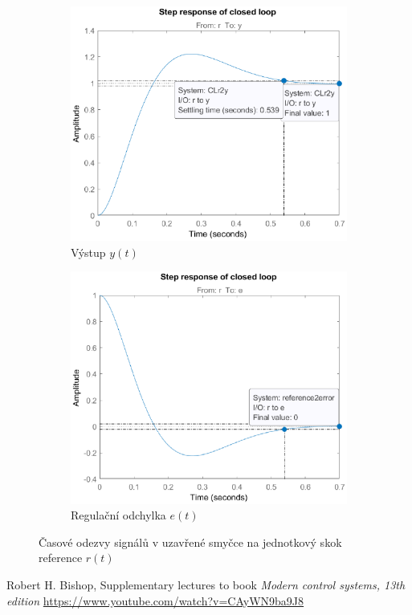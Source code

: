 \documentclass[twoside]{article}
\begin{document}
\begin{figure}[htbp]
	\centering
	\begin{subfigure}{0.45\textwidth}
		\includegraphics[width=\linewidth]{step_response.eps}
		\caption{Výstup $y(t)$}
		\label{fig:step}
	\end{subfigure}
	\begin{subfigure}{0.45\textwidth}
		\includegraphics[width=\linewidth]{step_response_error.eps}
		\caption{Regulační odchylka $e(t)$}
		\label{fig:step_error}
	\end{subfigure}
	\caption{Časové odezvy signálů v uzavřené smyčce na jednotkový skok reference $r(t)$}
\end{figure}

\begin{thebibliography}{9}

	Robert H. Bishop, Supplementary lectures to book \emph{Modern control systems, 13th edition} \url{https://www.youtube.com/watch?v=CAyWN9ba9J8}

\end{thebibliography}
\end{document}
